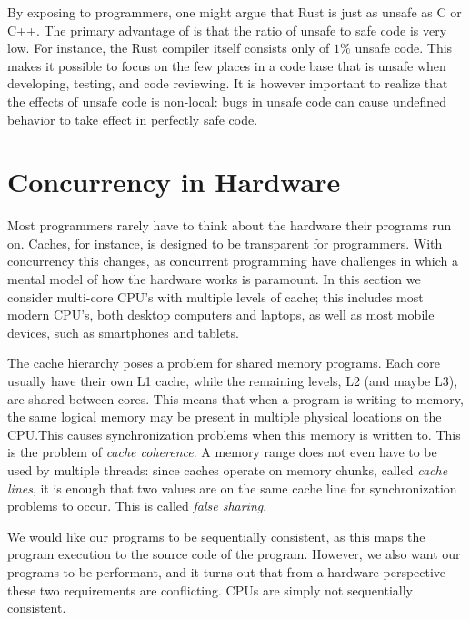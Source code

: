 \documentclass[b5paper]{report}
\begin{document}
By exposing  to programmers, one might argue that Rust is just as
unsafe as C or C++. The primary advantage of  is that the ratio of
unsafe to safe code is very low. For instance, the Rust compiler itself consists
only of $1\%$ unsafe code\cite{rustc-unsafe}. This makes it possible to focus on
the few places in a code base that is unsafe when developing, testing, and code
reviewing. It is however important to realize that the effects of unsafe code is
non-local: bugs in unsafe code can cause undefined behavior to take effect in
perfectly safe code.



\section{Concurrency in Hardware }

Most programmers rarely have to think about the hardware their programs run on.
Caches, for instance, is designed to be transparent for programmers. With
concurrency this changes, as concurrent programming have challenges in which a
mental model of how the hardware works is paramount. In this section we consider
multi-core CPU's with multiple levels of cache; this includes most modern CPU's,
both desktop computers and laptops, as well as most mobile devices, such as
smartphones and tablets.

The cache hierarchy poses a problem for shared memory programs. Each core
usually have their own L1 cache, while the remaining levels, L2 (and maybe L3),
are shared between cores. This means that when a program is writing to memory,
the same logical memory may be present in multiple physical locations on the
CPU.\@ This causes synchronization problems when this memory is written to. This
is the problem of \emph{cache coherence}. A memory range does not even have to
be used by multiple threads: since caches operate on memory chunks, called
\emph{cache lines}, it is enough that two values are on the same cache line for
synchronization problems to occur. This is called \emph{false sharing}.

We would like our programs to be sequentially consistent, as this maps the
program execution to the source code of the program. However, we also want our
programs to be performant, and it turns out that from a hardware perspective
these two requirements are conflicting. CPUs are simply not sequentially
consistent.
\end{document}
